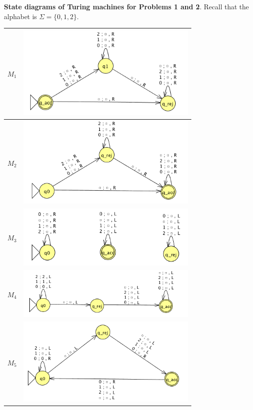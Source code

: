 \documentclass[10pt,letterpaper,unboxed,cm]{hmcpset}
\begin{document}
\newpage
\begin{center}
{\bf State diagrams of Turing machines for Problems 1 and 2}.  Recall that the alphabet is $\Sigma = \{0,1,2\}$.\\

\begin{tabular}{| c  c |}
\hline
$M_1$ & \includegraphics[width=3.5in]{TMex1_HW5.png} \\
\hline
\hline
$M_2$ & \includegraphics[width=3.5in]{TMex2_HW5.png} \\
\hline
\hline
$M_3$ & \includegraphics[width=3.5in]{TMex3_HW5.png} \\
\hline
\hline
$M_4$ & \includegraphics[width=3.5in]{TMex4_HW5.png} \\
\hline
\hline
$M_5$ & \includegraphics[width=3.5in]{TMex5_HW5.png} \\
\hline
\end{tabular}

\end{center}
\end{document}
